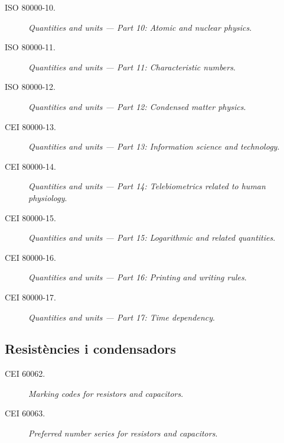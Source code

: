 \begin{description}
	\item [\hspace{5mm}ISO 80000-10.] \textit{Quantities and units --- Part 10: Atomic and nuclear physics}.
	\item [\hspace{5mm}ISO 80000-11.] \textit{Quantities and units --- Part 11: Characteristic numbers}.
	\item [\hspace{5mm}ISO 80000-12.] \textit{Quantities and units --- Part 12: Condensed matter physics}.
	\item [\hspace{5mm}CEI 80000-13.] \textit{Quantities and units --- Part 13: Information science and technology}.
	\item [\hspace{5mm}CEI 80000-14.] \textit{Quantities and units --- Part 14: Telebiometrics related to human physiology}.
	\item [\hspace{5mm}CEI 80000-15.] \textit{Quantities and units --- Part 15: Logarithmic and related quantities}.
	\item [\hspace{5mm}CEI 80000-16.] \textit{Quantities and units --- Part 16: Printing and writing rules}.
	\item [\hspace{5mm}CEI 80000-17.] \textit{Quantities and units --- Part 17: Time dependency}.    
\end{description}

\subsection*{Resistències i condensadors} 
\begin{description}
	\item [\hspace{5mm}CEI 60062.] \textit{Marking codes for resistors and capacitors}.	
	\item [\hspace{5mm}CEI 60063.] \textit{Preferred number series for resistors and capacitors}.
\end{description}

